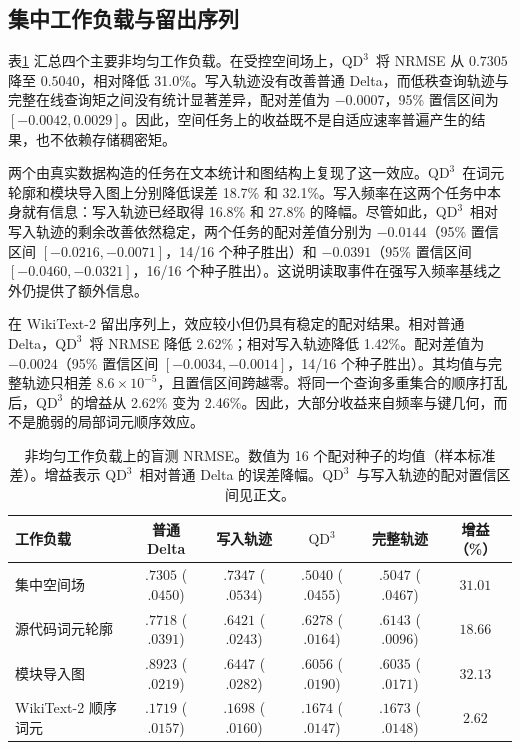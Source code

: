 \documentclass[11pt,a4paper]{ctexart}
\newcommand{\QDDD}{\ensuremath{\mathrm{QD}^{3}}}
\begin{document}
\subsection{集中工作负载与留出序列}

表\ref{tab:main-zh} 汇总四个主要非均匀工作负载。在受控空间场上，\QDDD\ 将 NRMSE 从 $0.7305$ 降至 $0.5040$，相对降低 31.0\%。写入轨迹没有改善普通 Delta，而低秩查询轨迹与完整在线查询矩之间没有统计显著差异，配对差值为 $-0.0007$，95\% 置信区间为 $[-0.0042,0.0029]$。因此，空间任务上的收益既不是自适应速率普遍产生的结果，也不依赖存储稠密矩。

两个由真实数据构造的任务在文本统计和图结构上复现了这一效应。\QDDD\ 在词元轮廓和模块导入图上分别降低误差 18.7\% 和 32.1\%。写入频率在这两个任务中本身就有信息：写入轨迹已经取得 16.8\% 和 27.8\% 的降幅。尽管如此，\QDDD\ 相对写入轨迹的剩余改善依然稳定，两个任务的配对差值分别为 $-0.0144$（95\% 置信区间 $[-0.0216,-0.0071]$，14/16 个种子胜出）和 $-0.0391$（95\% 置信区间 $[-0.0460,-0.0321]$，16/16 个种子胜出）。这说明读取事件在强写入频率基线之外仍提供了额外信息。

在 WikiText-2 留出序列上，效应较小但仍具有稳定的配对结果。相对普通 Delta，\QDDD\ 将 NRMSE 降低 2.62\%；相对写入轨迹降低 1.42\%。配对差值为 $-0.0024$（95\% 置信区间 $[-0.0034,-0.0014]$，14/16 个种子胜出）。其均值与完整轨迹只相差 $8.6\times10^{-5}$，且置信区间跨越零。将同一个查询多重集合的顺序打乱后，\QDDD\ 的增益从 2.62\% 变为 2.46\%。因此，大部分收益来自频率与键几何，而不是脆弱的局部词元顺序效应。

\begin{table}[t]
\caption{非均匀工作负载上的盲测 NRMSE。数值为 16 个配对种子的均值（样本标准差）。增益表示 \QDDD\ 相对普通 Delta 的误差降幅。\QDDD\ 与写入轨迹的配对置信区间见正文。}
\label{tab:main-zh}
\centering
\small
\setlength{\tabcolsep}{3.5pt}
\begin{tabular}{@{}lccccc@{}}
\toprule
工作负载 & 普通 Delta & 写入轨迹 & \QDDD & 完整轨迹 & 增益（\%） \\
\midrule
集中空间场 & $.7305$ ($.0450$) & $.7347$ ($.0534$) & $\bm{.5040}$ ($.0455$) & $.5047$ ($.0467$) & $31.01$ \\
源代码词元轮廓 & $.7718$ ($.0391$) & $.6421$ ($.0243$) & $\bm{.6278}$ ($.0164$) & $.6143$ ($.0096$) & $18.66$ \\
模块导入图 & $.8923$ ($.0219$) & $.6447$ ($.0282$) & $\bm{.6056}$ ($.0190$) & $.6035$ ($.0171$) & $32.13$ \\
WikiText-2 顺序词元 & $.1719$ ($.0157$) & $.1698$ ($.0160$) & $\bm{.1674}$ ($.0147$) & $.1673$ ($.0148$) & $2.62$ \\
\bottomrule
\end{tabular}
\end{table}
\end{document}
